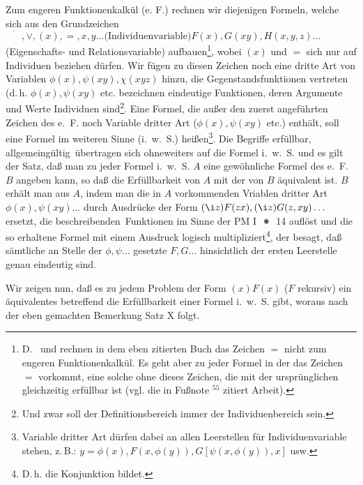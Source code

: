\documentclass[draft]{scrartcl}
\begin{document}
Zum engeren Funktionenkalkül (e. F.) rechnen wir diejenigen Formeln, welche sich aus den Grundzeichen $\overline{\phantom{XX}}, \lor, \left(x\right), =, x, y \dots \text{(Individuenvariable)} F\left(x\right), G\left(x y\right), H\left(x, y, z\right) \dots $ (Eigenschafts- und Relationsvariable) aufbauen\footnote{D.~ und  rechnen in dem eben zitierten Buch das Zeichen $=$ nicht zum engeren Funktionenkalkül. Es geht aber zu jeder Formel in der das Zeichen $=$ vorkommt, eine solche ohne dieses Zeichen, die mit der ursprünglichen gleichzeitig erfüllbar ist (vgl. die in Fußnote $^{55}$ zitiert Arbeit).},
wobei $\left(x\right)$ und $=$ sich nur
 auf Individuen beziehen dürfen. Wir fügen zu
 diesen Zeichen noch eine dritte Art von Variablen 
$\phi\left(x\right), \psi\left(x y\right), \chi\left(x y z\right)$ hinzu,
 die Gegenstandsfunktionen vertreten (d.\,h. $\phi\left(x\right), \psi\left(x y\right)$
 etc. bezeichnen eindeutige Funktionen, deren Argumente und Werte Individuen sind\footnote{Und zwar soll der Definitionsbereich immer der  Individuenbereich sein.}.
Eine Formel, die außer den zuerst angeführten Zeichen
des e.~F. noch Variable dritter Art ($\phi\left(x\right), \psi\left(x y\right)$ etc.) 
enthält, soll eine Formel im weiteren Sinne (i.~w.~S.) heißen\footnote{Variable dritter Art dürfen dabei an allen Leerstellen für Individuenvariable stehen, z.\,B.: 
$y = \phi\left(x\right), F\left(x, \phi\left(y\right)\right), G\left[\psi\left(x, \phi\left(y\right)\right), x\right]$ usw.}.
Die Begriffe \glqq erfüllbar\grqq, \glqq allgemeingültig\grqq\ übertragen 
sich ohneweiters auf die Formel i.~w.~S. und es gilt der Satz, daß man zu
jeder Formel i.~w.~S. $A$ eine gewöhnliche Formel des e.~F.
$B$ angeben kann, so daß die Erfüllbarkeit von $A$ mit der von $B$ äquivalent
ist. $B$ erhält man aus $A$, indem man die in $A$ vorkommenden Vriablen dritter 
Art $\phi\left(x\right), \psi\left(x y\right) \dots$ durch Ausdrücke der Form
$\left(\i z\right)F\left(z x\right), \left(\i z\right)G\left(z, x y\right)\dots$ ersetzt, 
die \glqq beschreibenden\grqq\ Funktionen im Sinne der PM I $\pmstar$ 14
auflöst und die so erhaltene Formel mit einem Ausdruck logisch 
multipliziert\footnote{D.\,h. die Konjunktion bildet.},
der besagt, daß sämtliche an Stelle der $\phi, \psi \dots$ gesetzte 
$F, G\dots$ hinsichtlich der ersten Leerstelle genau eindeutig sind.

Wir zeigen nun, daß es zu jedem Problem der Form $\left(x\right)F\left(x\right)$ ($F$ rekursiv) ein äquivalentes betreffend die Erfüllbarkeit einer Formel i.~w.~S. gibt, woraus nach der eben gemachten Bemerkung Satz X folgt.
\end{document}
